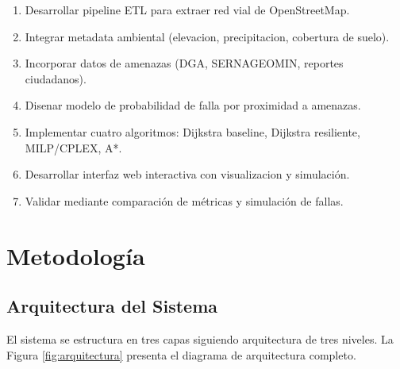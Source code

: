 \documentclass[conference]{IEEEtran}
\begin{document}
\begin{enumerate}
    \item Desarrollar pipeline ETL para extraer red vial de OpenStreetMap.
    \item Integrar metadata ambiental (elevacion, precipitacion, cobertura de suelo).
    \item Incorporar datos de amenazas (DGA, SERNAGEOMIN, reportes ciudadanos).
    \item Disenar modelo de probabilidad de falla por proximidad a amenazas.
    \item Implementar cuatro algoritmos: Dijkstra baseline, Dijkstra resiliente, MILP/CPLEX, A*.
    \item Desarrollar interfaz web interactiva con visualizacion y simulación.
    \item Validar mediante comparación de métricas y simulación de fallas.
\end{enumerate}

\section{Metodología}

\subsection{Arquitectura del Sistema}

El sistema se estructura en tres capas siguiendo arquitectura de tres niveles. La Figura \ref{fig:arquitectura} presenta el diagrama de arquitectura completo.
\end{document}
